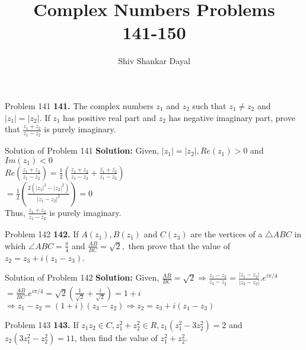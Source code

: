 \documentclass[aspectratio=169,8pt]{beamer}
\title{Complex Numbers Problems\\ 141-150}
\author[Shiv Shankar Dayal]{Shiv Shankar Dayal}
\begin{document}
\begin{frame}
  \titlepage
\end{frame}
\begin{frame}{Problem 141}
  \textbf{141.} The complex numbers $z_1$ and $z_2$ such that $z_1\neq z_2$ and $|z_1| = |z_2|$. If $z_1$ has positive real part
  and $z_2$ has negative imaginary part, prove that $\frac{z_1 + z_2}{z_1 - z_2}$ is purely imaginary.
\end{frame}
\begin{frame}{Solution of Problem 141}
  \textbf{Solution:} Given, $|z_1| = |z_2|, Re(z_1) > 0$ and $Im(z_1) < 0$\\
  \vspace*{0.2cm}
  $Re\left(\frac{z_1 + z_2}{z_1 - z_2}\right) = \frac{1}{2}\left(\frac{z_1 + z_2}{z_1 - z_2} + \frac{\overline{z_1} +
    \overline{z_2}}{\overline{z_1} - \overline{z_2}}\right)$\\
  \vspace*{0.2cm}
  $= \frac{1}{2}\left(\frac{2(|z_1|^2 - |z_2|^2)}{|z_1 - z_2|^2}\right) = 0$\\
  \vspace*{0.2cm}
  Thus, $\frac{z_1 + z_2}{z_1 - z_2}$ is purely imaginary.
\end{frame}
\begin{frame}{Problem 142}
  \textbf{142.} If $A(z_1), B(z_1)$ and $C(z_3)$ are the vertices of a $\triangle ABC$ in which $\angle ABC = \frac{\pi}{4}$ and
  $\frac{AB}{BC} = \sqrt{2},$ then prove that the value of $z_2 = z_3 + i(z_1 - z_3)$.
\end{frame}
\begin{frame}{Solution of Problem 142}
  \textbf{Solution:} Given, $\frac{AB}{BC} = \sqrt{2} \Rightarrow \frac{z_1 - z_2}{z_3 - z_2} = \frac{|z_1 - z_2|}{|z_3 - z_2|}.e^{i\pi/4}$\\
  \vspace*{0.2cm}
  $= \frac{AB}{BC}.e^{i\pi/4} = \sqrt{2}\left(\frac{1}{\sqrt{2}} + \frac{i}{\sqrt{2}}\right) = 1 + i$\\
  \vspace*{0.2cm}
  $\Rightarrow z_1 - z_2 = (1 + i)(z_3 - z_2) \Rightarrow z_2 = z_3 + i(z_1 - z_3)$
\end{frame}
\begin{frame}{Problem 143}
  \textbf{143.} If $z_1z_2\in C, z_1^2 + z_2^2 \in R, z_1(z_1^2 - 3z_2^2) = 2$ and $z_2(3z_1^2 - z_2^2) = 11$, then find the value
  of $z_1^2 + z_2^2$.
\end{frame}
\end{document}
